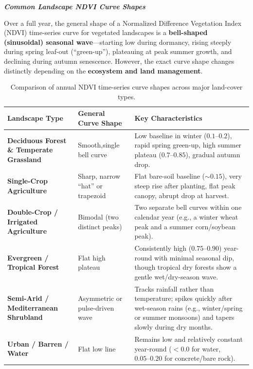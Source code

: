 \documentclass[12pt, letterpaper]{article}
\begin{document}
\bigskip 
\LARGE
\begin{flushleft}
\textbf{\textit{Common Landscape NDVI Curve Shapes}}
\end{flushleft}
\normalsize

Over a full year, the general shape of a Normalized Difference Vegetation Index (NDVI) time-series curve for vegetated landscapes is a \textbf{bell-shaped (sinusoidal) seasonal wave}---starting low during dormancy, rising steeply during spring leaf-out (``green-up''), plateauing at peak summer growth, and declining during autumn senescence. However, the exact curve shape changes distinctly depending on the \textbf{ecosystem and land management}.


\begin{table}[h!]
\centering
\renewcommand{\arraystretch}{1.35}
\begin{tabularx}{\textwidth}{>{\bfseries}p{3.8cm} p{3.8cm} X}
\toprule
Landscape Type & General Curve Shape & Key Characteristics \\
\midrule
Deciduous Forest \& Temperate Grassland & Smooth,single bell curve & Low baseline in winter ($0.1\text{--}0.2$), rapid spring green-up, high summer plateau ($0.7\text{--}0.85$), gradual autumn drop. \\
Single-Crop Agriculture & Sharp, narrow ``hat'' or trapezoid & Flat bare-soil baseline ($\sim 0.15$), very steep rise after planting, flat peak canopy, abrupt drop at harvest. \\
Double-Crop / Irrigated Agriculture & Bimodal (two distinct peaks) & Two separate bell curves within one calendar year (e.g., a winter wheat peak and a summer corn/soybean peak). \\
Evergreen / Tropical Forest & Flat high plateau & Consistently high ($0.75\text{--}0.90$) year-round with minimal seasonal dip, though tropical dry forests show a gentle wet/dry-season wave. \\
Semi-Arid / Mediterranean Shrubland & Asymmetric or pulse-driven wave & Tracks rainfall rather than temperature; spikes quickly after wet-season rains (e.g., winter/spring or summer monsoons) and tapers slowly during dry months. \\
Urban / Barren / Water & Flat low line & Remains low and relatively constant year-round ($< 0.0$ for water, $0.05\text{--}0.20$ for concrete/bare rock). \\
\bottomrule
\end{tabularx}
\caption{Comparison of annual NDVI time-series curve shapes across major land-cover types.}
\end{table}
\end{document}
